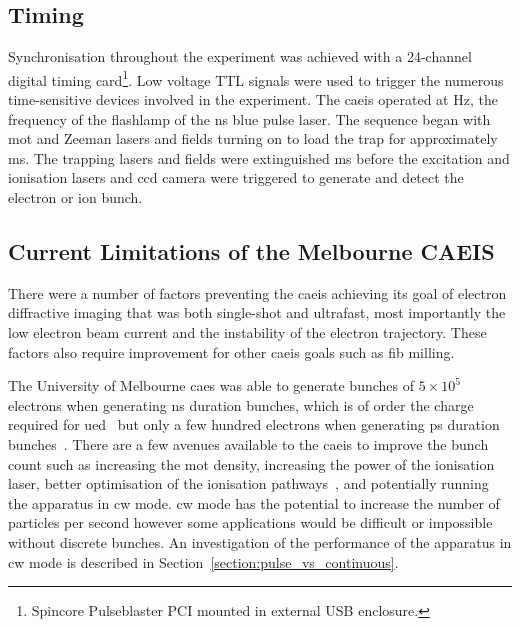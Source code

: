 \subsection{Timing}\label{section:pulse_blaster}

Synchronisation throughout the experiment was achieved with a 24-channel digital timing card\footnote{Spincore Pulseblaster PCI mounted in external USB enclosure.}.
Low voltage TTL signals were used to trigger the numerous time-sensitive devices involved in the experiment.
The \gls{caeis} operated at \unit[10]{Hz}, the frequency of the flashlamp of the \unit[5]{ns} blue pulse laser.
The sequence began with \gls{mot} and Zeeman lasers and fields turning on to load the trap for approximately \unit[90]{ms}.
The trapping lasers and fields were extinguished \unit[5]{ms} before the excitation and ionisation lasers and \gls{ccd} camera were triggered to generate and detect the electron or ion bunch.

\subsection{Current Limitations of the Melbourne CAEIS}

There were a number of factors preventing the \gls{caeis} achieving its goal of electron diffractive imaging that was both single-shot and ultrafast, most importantly the low electron beam current and the instability of the electron trajectory.
These factors also require improvement for other \gls{caeis} goals such as \gls{fib} milling.

The University of Melbourne \gls{caes} was able to generate bunches of $5\times10^5$ electrons when generating \unit[5]{ns} duration bunches, which is of order the charge required for \gls{ued}~\cite{van_oudheusden_compression_2010} but only a few hundred electrons when generating \unit[10]{ps} duration bunches~\cite{speirs_identification_2017}.
There are a few avenues available to the \gls{caeis} to improve the bunch count such as increasing the \gls{mot} density, increasing the power of the ionisation laser, better optimisation of the ionisation pathways~\cite{mcculloch_field_2017}, and potentially running the apparatus in \gls{cw} mode.
\Gls{cw} mode has the potential to increase the number of particles per second however some applications would be difficult or impossible without discrete bunches.
An investigation of the performance of the apparatus in \gls{cw} mode is described in Section~\ref{section:pulse_vs_continuous}.

